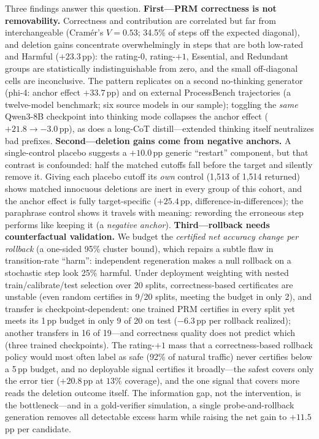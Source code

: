 \documentclass[11pt]{article}
\begin{document}
Three findings answer this question. \textbf{First---PRM correctness is not removability.} Correctness and contribution are correlated but far from interchangeable (Cram\'er's $V = 0.53$; 34.5\% of steps off the expected diagonal), and deletion gains concentrate overwhelmingly in steps that are both low-rated and Harmful ($+23.3$\,pp): the rating-$0$, rating-$+1$, Essential, and Redundant groups are statistically indistinguishable from zero, and the small off-diagonal cells are inconclusive. The pattern replicates on a second no-thinking generator (phi-4: anchor effect $+33.7$\,pp) and on external ProcessBench trajectories (a twelve-model benchmark; six source models in our sample); toggling the \emph{same} Qwen3-8B checkpoint into thinking mode collapses the anchor effect ($+21.8 \to -3.0$\,pp), as does a long-CoT distill---extended thinking itself neutralizes bad prefixes. \textbf{Second---deletion gains come from negative anchors.} A single-control placebo suggests a $+10.0$\,pp generic ``restart'' component, but that contrast is confounded: half the matched cutoffs fall before the target and silently remove it. Giving each placebo cutoff its \emph{own} control (1{,}513 of 1{,}514 returned) shows matched innocuous deletions are inert in every group of this cohort, and the anchor effect is fully target-specific ($+25.4$\,pp, difference-in-differences); the paraphrase control shows it travels with meaning: rewording the erroneous step performs like keeping it (a \emph{negative anchor}). \textbf{Third---rollback needs counterfactual validation.} We budget the \emph{certified net accuracy change per rollback} (a one-sided 95\% cluster bound), which repairs a subtle flaw in transition-rate ``harm'': independent regeneration makes a null rollback on a stochastic step look 25\% harmful. Under deployment weighting with nested train/calibrate/test selection over 20 splits, correctness-based certificates are unstable (even random certifies in 9/20 splits, meeting the budget in only 2), and transfer is checkpoint-dependent: one trained PRM certifies in every split yet meets its 1\,pp budget in only 9 of 20 on test ($-6.3$\,pp per rollback realized); another transfers in 16 of 19---and correctness quality does not predict which (three trained checkpoints). The rating-$+1$ mass that a correctness-based rollback policy would most often label as safe (92\% of natural traffic) never certifies below a 5\,pp budget, and no deployable signal certifies it broadly---the safest covers only the error tier ($+20.8$\,pp at $13\%$ coverage), and the one signal that covers more reads the deletion outcome itself. The information gap, not the intervention, is the bottleneck---and in a gold-verifier simulation, a single probe-and-rollback generation removes all detectable excess harm while raising the net gain to $+11.5$\,pp per candidate.
\end{document}
